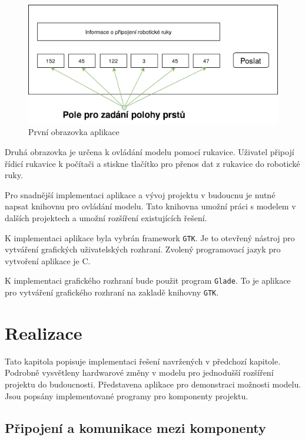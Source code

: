 \documentclass[thesis=B,czech]{FITthesis}[2012/06/26]
\begin{document}
 \begin{figure}[H]
\centering
\includegraphics[scale=0.28]{./image/wirwframe1.png}
\caption{První obrazovka aplikace}
\label{fig:wirwframe1}
\end{figure}


Druhá obrazovka je určena k ovládání modelu pomocí rukavice. Uživatel připojí řídicí rukavice k počítači a stiskne tlačítko pro přenos dat z rukavice do robotické ruky.


Pro snadnější implementaci aplikace a vývoj projektu v budoucnu je nutné napsat knihovnu pro ovládání modelu. Tato knihovna umožní práci s modelem v dalších projektech a umožní rozšíření existujících řešení.  


K implementaci aplikace byla vybrán framework \texttt{GTK}. Je to otevřený nástroj pro vytváření grafických uživatelských rozhraní. Zvolený programovací jazyk pro vytvoření aplikace je C.


K implementaci grafického rozhraní bude použit program \texttt{Glade}\cite{gladePr}. To je aplikace pro vytváření grafického rozhraní na zakladě knihovny \texttt{GTK}. 


\chapter{Realizace}

Tato kapitola popisuje implementaci řešení navržených v předchozí kapitole. Podrobně vysvětleny hardwarové změny v modelu pro jednodušší rozšíření projektu do budoucnosti. Představena aplikace pro demonstraci možnosti modelu. Jsou popsány implementované programy pro komponenty projektu.

\section{Připojení a komunikace mezi komponenty}
\end{document}

